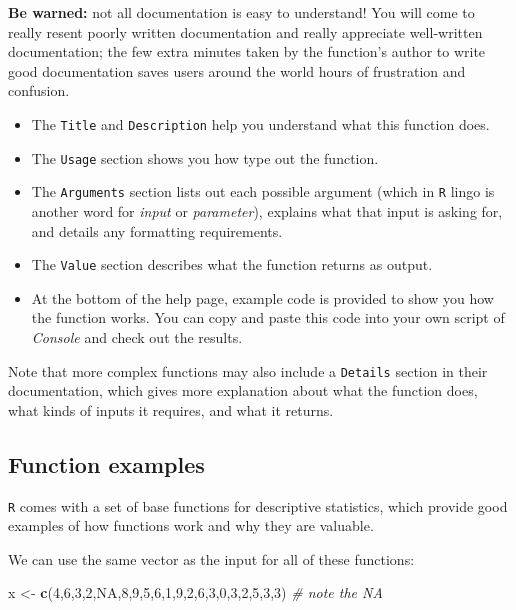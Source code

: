 \documentclass[
]{book}
\newenvironment{Shaded}{\begin{snugshade}}{\end{snugshade}}
\newcommand{\CommentTok}[1]{\textcolor[rgb]{0.56,0.35,0.01}{\textit{#1}}}
\newcommand{\DecValTok}[1]{\textcolor[rgb]{0.00,0.00,0.81}{#1}}
\newcommand{\KeywordTok}[1]{\textcolor[rgb]{0.13,0.29,0.53}{\textbf{#1}}}
\newcommand{\NormalTok}[1]{#1}
\newcommand{\OtherTok}[1]{\textcolor[rgb]{0.56,0.35,0.01}{#1}}
\newcommand{\StringTok}[1]{\textcolor[rgb]{0.31,0.60,0.02}{#1}}
\begin{document}
\textbf{Be warned:} not all documentation is easy to understand! You will come to really resent poorly written documentation and really appreciate well-written documentation; the few extra minutes taken by the function's author to write good documentation saves users around the world hours of frustration and confusion.

\begin{itemize}
\item
  The \texttt{Title} and \texttt{Description} help you understand what this function does.
\item
  The \texttt{Usage} section shows you how type out the function.
\item
  The \texttt{Arguments} section lists out each possible argument (which in \texttt{R} lingo is another word for \emph{input} or \emph{parameter}), explains what that input is asking for, and details any formatting requirements.
\item
  The \texttt{Value} section describes what the function returns as output.
\item
  At the bottom of the help page, example code is provided to show you how the function works. You can copy and paste this code into your own script of \emph{Console} and check out the results.
\end{itemize}

Note that more complex functions may also include a \texttt{Details} section in their documentation, which gives more explanation about what the function does, what kinds of inputs it requires, and what it returns.

\hypertarget{function-examples}{%
\subsection*{Function examples}\label{function-examples}}

\texttt{R} comes with a set of base functions for descriptive statistics, which provide good examples of how functions work and why they are valuable.

We can use the same vector as the input for all of these functions:

\begin{Shaded}
\begin{Highlighting}[]
\NormalTok{x <-}\StringTok{ }\KeywordTok{c}\NormalTok{(}\DecValTok{4}\NormalTok{,}\DecValTok{6}\NormalTok{,}\DecValTok{3}\NormalTok{,}\DecValTok{2}\NormalTok{,}\OtherTok{NA}\NormalTok{,}\DecValTok{8}\NormalTok{,}\DecValTok{9}\NormalTok{,}\DecValTok{5}\NormalTok{,}\DecValTok{6}\NormalTok{,}\DecValTok{1}\NormalTok{,}\DecValTok{9}\NormalTok{,}\DecValTok{2}\NormalTok{,}\DecValTok{6}\NormalTok{,}\DecValTok{3}\NormalTok{,}\DecValTok{0}\NormalTok{,}\DecValTok{3}\NormalTok{,}\DecValTok{2}\NormalTok{,}\DecValTok{5}\NormalTok{,}\DecValTok{3}\NormalTok{,}\DecValTok{3}\NormalTok{)  }\CommentTok{# note the NA}
\end{Highlighting}
\end{Shaded}
\end{document}
